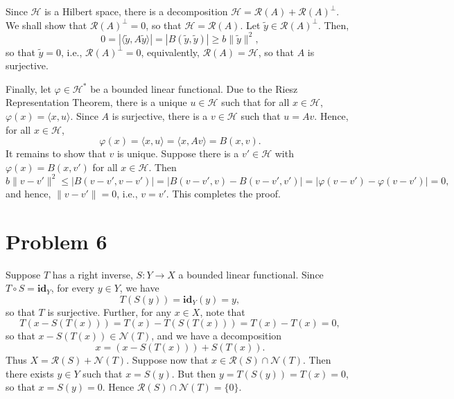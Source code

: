 \documentclass[11pt]{article}
\theoremstyle{thmstyle}
\theoremstyle{defstyle}
\newcommand{\id}{\mathbf{id}}
\newcommand{\wt}[1]{\widetilde{#1}}
\renewcommand{\le}{\leqslant}
\renewcommand{\ge}{\geqslant}
\newcommand{\calN}{\mathcal{N}}
\newcommand{\calH}{\mathcal{H}}
\begin{document}
Since $\calH$ is a Hilbert space, there is a decomposition $\calH = \mathcal R(A) + \mathcal R(A)^\perp$. We shall show that $\mathcal R(A)^\perp = 0$, so that $\calH = \mathcal R(A)$. Let $\wt y\in\mathcal R(A)^\perp$. Then, 
\begin{equation*}
    0 = \left|\langle \wt y, A\wt y\rangle\right| = \left|B(\wt y, \wt y)\right|\ge b\|\wt y\|^2,
\end{equation*}
so that $\wt y = 0$, i.e., $\mathcal R(A)^\perp = 0$, equivalently, $\mathcal R(A) = \calH$, so that $A$ is surjective.

Finally, let $\varphi\in\calH^\ast$ be a bounded linear functional. Due to the Riesz Representation Theorem, there is a unique $u\in\calH$ such that for all $x\in\calH$, $\varphi(x) = \langle x, u\rangle$. Since $A$ is surjective, there is a $v\in\calH$ such that $u = Av$. Hence, for all $x\in\calH$, 
\begin{equation*}
    \varphi(x) = \langle x, u\rangle = \langle x, Av\rangle = B(x, v).
\end{equation*}
It remains to show that $v$ is unique. Suppose there is a $v'\in\calH$ with $\varphi(x) = B(x, v')$ for all $x\in\calH$. Then 
\begin{equation*}
    b\|v - v'\|^2\le \left|B(v - v', v - v')\right| = \left|B(v - v', v) - B(v - v', v')\right| = \left|\varphi(v - v') - \varphi(v - v')\right| = 0,
\end{equation*}
and hence, $\|v - v'\| = 0$, i.e., $v = v'$. This completes the proof.

\section{Problem 6}

Suppose $T$ has a right inverse, $S\colon Y\to X$ a bounded linear functional. Since $T\circ S = \id_Y$, for every $y\in Y$, we have 
\begin{equation*}
    T(S(y)) = \id_Y(y) = y,
\end{equation*}
so that $T$ is surjective. Further, for any $x\in X$, note that 
\begin{equation*}
    T\left(x - S(T(x))\right) = T(x) - T\left(S(T(x))\right) = T(x) - T(x) = 0,
\end{equation*}
so that $x - S(T(x))\in\calN(T)$, and we have a decomposition 
\begin{equation*}
    x = \left(x - S(T(x))\right) + S(T(x)).
\end{equation*}
Thus $X = \mathcal R(S) + \calN(T)$. Suppose now that $x\in\mathcal R(S)\cap\calN(T)$. Then there exists $y\in Y$ such that $x = S(y)$. But then $y = T(S(y)) = T(x) = 0$, so that $x = S(y) = 0$. Hence $\mathcal R(S)\cap\calN(T) = \{0\}$. 
\end{document}
